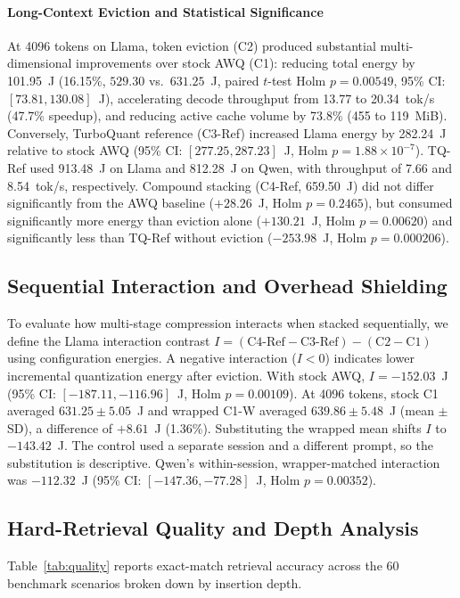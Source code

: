 \documentclass[conference,a4paper]{IEEEtran}
\begin{document}
\paragraph{Long-Context Eviction and Statistical Significance}
At 4096 tokens on Llama, token eviction (C2) produced substantial multi-dimensional improvements over stock AWQ (C1): reducing total energy by 101.95~J (16.15\%, $529.30$ vs.\ $631.25$~J, paired $t$-test Holm $p = 0.00549$, 95\% CI: $[73.81, 130.08]$~J), accelerating decode throughput from 13.77 to 20.34~tok/s (47.7\% speedup), and reducing active cache volume by 73.8\% (455 to 119~MiB). Conversely, TurboQuant reference (C3-Ref) increased Llama energy by 282.24~J relative to stock AWQ (95\% CI: $[277.25, 287.23]$~J, Holm $p = 1.88 \times 10^{-7}$). TQ-Ref used 913.48~J on Llama and 812.28~J on Qwen, with throughput of 7.66 and 8.54~tok/s, respectively. Compound stacking (C4-Ref, 659.50~J) did not differ significantly from the AWQ baseline ($+28.26$~J, Holm $p = 0.2465$), but consumed significantly more energy than eviction alone ($+130.21$~J, Holm $p = 0.00620$) and significantly less than TQ-Ref without eviction ($-253.98$~J, Holm $p = 0.000206$).

\subsection{Sequential Interaction and Overhead Shielding}
\label{sec:interaction}
To evaluate how multi-stage compression interacts when stacked sequentially, we define the Llama interaction contrast $I = (\text{C4-Ref} - \text{C3-Ref}) - (\text{C2} - \text{C1})$ using configuration energies. A negative interaction ($I < 0$) indicates lower incremental quantization energy after eviction. With stock AWQ, $I = -152.03$~J (95\% CI: $[-187.11, -116.96]$~J, Holm $p = 0.00109$). At 4096 tokens, stock C1 averaged $631.25 \pm 5.05$~J and wrapped C1-W averaged $639.86 \pm 5.48$~J (mean $\pm$ SD), a difference of $+8.61$~J (1.36\%). Substituting the wrapped mean shifts $I$ to $-143.42$~J. The control used a separate session and a different prompt, so the substitution is descriptive. Qwen's within-session, wrapper-matched interaction was $-112.32$~J (95\% CI: $[-147.36, -77.28]$~J, Holm $p = 0.00352$).

\subsection{Hard-Retrieval Quality and Depth Analysis}

Table~\ref{tab:quality} reports exact-match retrieval accuracy across the 60 benchmark scenarios broken down by insertion depth.
\end{document}
